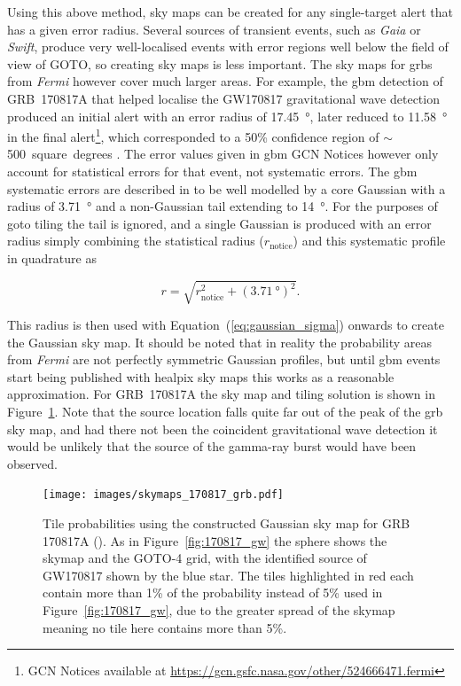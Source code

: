 \begin{colsection}
\begin{colsection}
Using this above method, sky maps can be created for any single-target alert that has a given error radius. Several sources of transient events, such as \textit{Gaia} or \textit{Swift}, produce very well-localised events with error regions well below the field of view of GOTO, so creating sky maps is less important. The sky maps for \glspl{grb} from \textit{Fermi} however cover much larger areas. For example, the \gls{gbm} detection of GRB~170817A that helped localise the GW170817 gravitational wave detection produced an initial alert with an error radius of \SI{17.45}{\degree}, later reduced to \SI{11.58}{\degree} in the final alert\footnote{GCN Notices available at \url{https://gcn.gsfc.nasa.gov/other/524666471.fermi}}, which corresponded to a 50\% confidence region of $\sim$500~square~degrees \citep{GW170817_Fermi}. The error values given in \gls{gbm} GCN Notices however only account for statistical errors for that event, not systematic errors. The \gls{gbm} systematic errors are described in \citet{Fermi_localisation} to be well modelled by a core Gaussian with a radius of \SI{3.71}{\degree} and a non-Gaussian tail extending to \SI{14}{\degree}. For the purposes of \gls{goto} tiling the tail is ignored, and a single Gaussian is produced with an error radius simply combining the statistical radius ($r_\text{notice}$) and this  systematic profile in quadrature as

\begin{equation}
    r = \sqrt{r_\text{notice}^2 + {(\SI{3.71}{\degree})}^2}.
    \label{eq:fermi_radius}
\end{equation}

This radius is then used with Equation~(\ref{eq:gaussian_sigma}) onwards to create the Gaussian sky map. It should be noted that in reality the probability areas from \textit{Fermi} are not perfectly symmetric Gaussian profiles, but until \gls{gbm} events start being published with \gls{healpix} sky maps this works as a reasonable approximation. For GRB~170817A the sky map and tiling solution is shown in Figure~\ref{fig:170817_grb}. Note that the source location falls quite far out of the peak of the \gls{grb} sky map, and had there not been the coincident gravitational wave detection it would be unlikely that the source of the gamma-ray burst would have been observed.

\begin{figure}[p]
\begin{center}
\texttt{[image: images/skymaps\_170817\_grb.pdf]}
\end{center}
\caption[Tile probabilities for GRB 170817A]{Tile probabilities using the constructed Gaussian sky map for GRB 170817A (\cite{GW170817_Fermi}). As in Figure~\ref{fig:170817_gw} the sphere shows the skymap and the GOTO-4 grid, with the identified source of GW170817 shown by the blue star. The tiles highlighted in red each contain more than 1\% of the probability instead of 5\% used in Figure~\ref{fig:170817_gw}, due to the greater spread of the skymap meaning no tile here contains more than 5\%.
}
\label{fig:170817_grb}
\end{figure}


\end{colsection}
\end{colsection}
